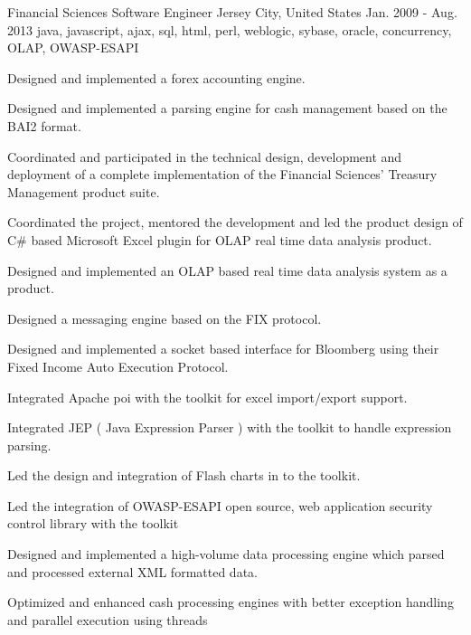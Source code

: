 \cventry
    {Financial Sciences} %
    {Software Engineer} %
    {Jersey City, United States} %
    {Jan. 2009 - Aug. 2013} %
    {java, javascript, ajax, sql, html, perl, weblogic, sybase, oracle, concurrency, OLAP, OWASP-ESAPI} %
    {
    \begin{cvitems} %
        \item { Designed and implemented a forex accounting engine. }
        \item { Designed and implemented a parsing engine for cash management based on the BAI2 format.}
        \item { Coordinated and participated in the technical design, development and deployment of a complete implementation of the Financial Sciences' Treasury Management product suite.}
        \item { Coordinated the project, mentored the development and led the product design of C\# based Microsoft Excel plugin for OLAP real time data analysis product.}
        \item { Designed and implemented an OLAP based real time data analysis system as a product. }
        \item { Designed a messaging engine based on the FIX protocol. }
        \item { Designed and implemented a socket based interface for Bloomberg using their Fixed Income Auto Execution Protocol. }
        \item { Integrated Apache poi with the toolkit for excel import/export support.}
        \item { Integrated JEP ( Java Expression Parser ) with the toolkit to handle expression parsing.}
        \item { Led the design and integration of Flash charts in to the toolkit. }
        \item { Led the integration of OWASP-ESAPI open source, web application security control library with the toolkit}
        \item { Designed and implemented a high-volume data processing engine which parsed and processed external XML formatted data.}
        \item { Optimized and enhanced cash processing engines with better exception handling and parallel execution using threads }
    \end{cvitems}
    }